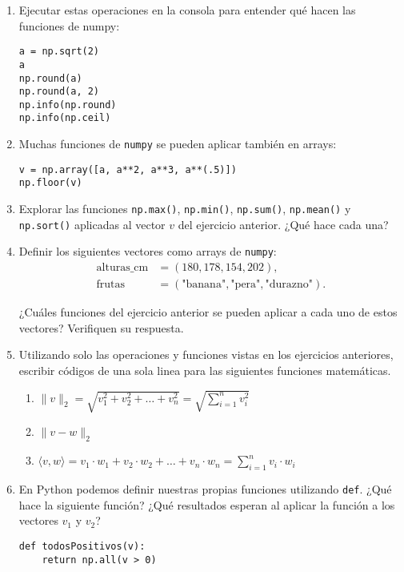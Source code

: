 \documentclass[a4paper,11pt]{article}
\theoremstyle{definition}
\begin{document}
\begin{enumerate}[resume]
\item Ejecutar estas operaciones en la consola para entender qué hacen las funciones de numpy:
\begin{lstlisting}
a = np.sqrt(2)
a
np.round(a)
np.round(a, 2)
np.info(np.round)
np.info(np.ceil)
\end{lstlisting}

\item Muchas funciones de \lstinline{numpy} se pueden aplicar también en arrays:
\begin{lstlisting}
v = np.array([a, a**2, a**3, a**(.5)])
np.floor(v)
\end{lstlisting}

\item Explorar las funciones \lstinline{np.max()}, \lstinline{np.min()}, \lstinline{np.sum()}, \lstinline{np.mean()} y \lstinline{np.sort()} aplicadas al vector $v$ del ejercicio anterior. ¿Qué hace cada una?

\item Definir los siguientes vectores como arrays de \lstinline{numpy}:
\begin{align*}
\text{alturas\_cm} &= (180, 178, 154, 202), \\
\text{frutas} &= (\text{"banana"}, \text{"pera"}, \text{"durazno"}).
\end{align*}

¿Cuáles funciones del ejercicio anterior se pueden aplicar a cada uno de estos vectores? Verifiquen su respuesta.


\item Utilizando solo las operaciones y funciones vistas en los ejercicios anteriores, escribir códigos de una sola linea para las siguientes funciones matemáticas.
\begin{enumerate}
\item $\|v\|_2 = \sqrt{v_1^2 + v_2^2 + \dots + v_n^2} = \sqrt{\sum_{i=1}^n v_i^2}$
\item $\|v - w\|_2$
\item $\langle v, w\rangle = v_1 \cdot w_1 + v_2 \cdot w_2 + \dots + v_n \cdot w_n = \sum_{i=1}^n v_i \cdot w_i$
\end{enumerate}

\item En Python podemos definir nuestras propias funciones utilizando \lstinline{def}. ¿Qué hace la siguiente función? ¿Qué resultados esperan al aplicar la función a los vectores $v_1$ y $v_2$?
\begin{lstlisting}
def todosPositivos(v):
    return np.all(v > 0)



\end{lstlisting}
\end{enumerate}
\end{document}
